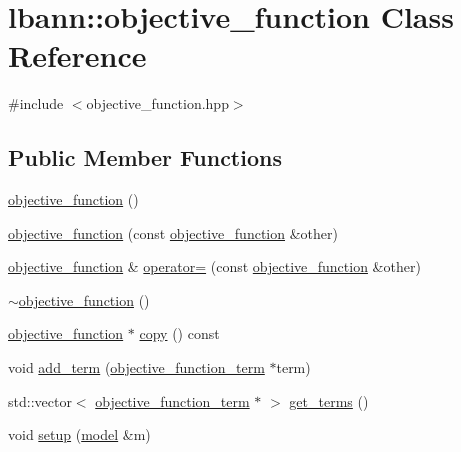 \hypertarget{classlbann_1_1objective__function}{}\section{lbann\+:\+:objective\+\_\+function Class Reference}
\label{classlbann_1_1objective__function}


{\ttfamily \#include $<$objective\+\_\+function.\+hpp$>$}

\subsection*{Public Member Functions}
\begin{DoxyCompactItemize}
\item 
\hyperlink{classlbann_1_1objective__function_a89e96fddff19f13a6d3acafe4394fd65}{objective\+\_\+function} ()
\item 
\hyperlink{classlbann_1_1objective__function_a67523a368d2fc31d8be9081139ec0a73}{objective\+\_\+function} (const \hyperlink{classlbann_1_1objective__function}{objective\+\_\+function} \&other)
\item 
\hyperlink{classlbann_1_1objective__function}{objective\+\_\+function} \& \hyperlink{classlbann_1_1objective__function_ab0695b92af6dec63912e5ef0cb81b953}{operator=} (const \hyperlink{classlbann_1_1objective__function}{objective\+\_\+function} \&other)
\item 
\hyperlink{classlbann_1_1objective__function_a823ebffb8056cb4a9ff0b2af7cf084b4}{$\sim$objective\+\_\+function} ()
\item 
\hyperlink{classlbann_1_1objective__function}{objective\+\_\+function} $\ast$ \hyperlink{classlbann_1_1objective__function_a8ab03f0dc1d2c067b895f5859bacd810}{copy} () const
\item 
void \hyperlink{classlbann_1_1objective__function_a98ba95d702f542ed99ccbf9e5cdde21d}{add\+\_\+term} (\hyperlink{classlbann_1_1objective__function__term}{objective\+\_\+function\+\_\+term} $\ast$term)
\item 
std\+::vector$<$ \hyperlink{classlbann_1_1objective__function__term}{objective\+\_\+function\+\_\+term} $\ast$ $>$ \hyperlink{classlbann_1_1objective__function_a510544e9e511be54a50efd39226de345}{get\+\_\+terms} ()
\item 
void \hyperlink{classlbann_1_1objective__function_ac14bb274978e0a5182122fd179579878}{setup} (\hyperlink{classlbann_1_1model}{model} \&m)
\item 

\end{DoxyCompactItemize}
